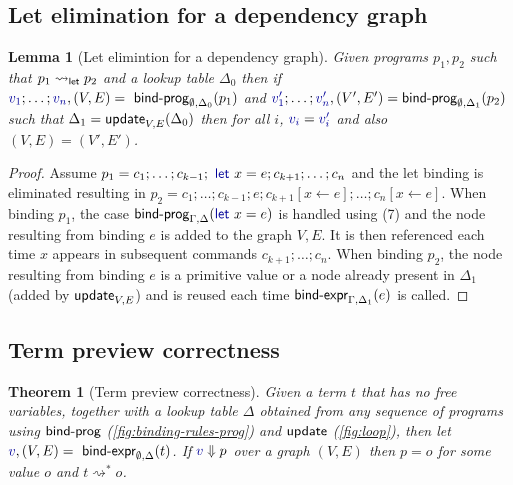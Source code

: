 \documentclass[english,crc,references=cleveref]{programming}
\newcounter{thc}
\theoremstyle{plain}
\newtheorem{lem}[thc]{Lemma}
\newtheorem{theorem}[thc]{Theorem}
\theoremstyle{definition}
\newcommand{\ident}[1]{\textnormal{\textcolor{idclr}{\sffamily #1}}}
\newcommand{\kvd}[1]{\textnormal{\textcolor{kvdclr}{\sffamily #1}}}
\newcommand{\bndclr}[1]{\textcolor{kvdclr}{#1}}
\begin{document}
\subsection{Let elimination for a dependency graph}
\label{sec:app-let-grp-elimination}

\begin{lem}[Let elimintion for a dependency graph]
\label{thm:app-let-grp-elimination}
Given programs $p_1, p_2$ such that $p_1 \rightsquigarrow_\ident{let} p_2$ and a lookup table
$\Delta_0$ then if $\bndclr{v_1}; \ldots; \bndclr{v_n}, (V, E) = \ident{bind-prog}_{\emptyset, \Delta_0}(p_1)$ and
$\bndclr{v'_1};\ldots;\bndclr{v'_n}, (V', E') = \ident{bind-prog}_{\emptyset, \Delta_1}(p_2)$ such that $\Delta_1 = \ident{update}_{V, E}(\Delta_0)$
then for all $i$, $\bndclr{v_i} = \bndclr{v'_i}$ and also $(V, E) = (V', E')$.
\end{lem}
\begin{proof}
Assume $p_1 = c_1; \ldots; c_{k-1}; \kvd{let}~x=e; c_{k+1};\ldots; c_n$ and the let binding is
eliminated resulting in $p_2 = c_1; \ldots; c_{k-1}; e; c_{k+1}[x\leftarrow e];\ldots; c_n[x\leftarrow e]$.
When binding $p_1$, the case $\ident{bind-prog}_{\Gamma,\Delta}(\kvd{let}~x=e)$ is handled using (7)
and the node resulting from binding $e$ is added to the graph $V, E$. It is then referenced each
time $x$ appears in subsequent commands $c_{k+1}; \ldots; c_n$.
When binding $p_2$, the node resulting from binding $e$ is a primitive value or a node already
present in $\Delta_1$ (added by $\ident{update}_{V, E}$) and is reused each time
$\ident{bind-expr}_{\Gamma,\Delta_1}(e)$ is called.
\end{proof}


\subsection{Term preview correctness}
\label{sec:app-correctness}

\begin{theorem}[Term preview correctness]
Given a term $t$ that has no free variables, together with a lookup table $\Delta$ obtained
from any sequence of programs using $\ident{bind-prog}$ (\cref{fig:binding-rules-prog}) and
$\ident{update}$ (\cref{fig:loop}), then
let $\bndclr{v}, (V, E) = \ident{bind-expr}_{\emptyset, \Delta}(t)$. If $\bndclr{v}\Downarrow p$
over a graph $(V, E)$ then $p = o$ for some value $o$ and $t \rightsquigarrow^{*} o$.
\end{theorem}
\end{document}
